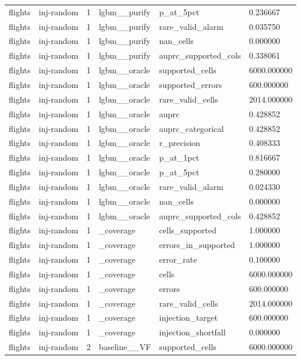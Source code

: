 \begin{tabular}{llllll}
flights & inj-random & 1 & lgbm\_\_purify & p\_at\_5pct & 0.236667 \\
flights & inj-random & 1 & lgbm\_\_purify & rare\_valid\_alarm & 0.035750 \\
flights & inj-random & 1 & lgbm\_\_purify & nan\_cells & 0.000000 \\
flights & inj-random & 1 & lgbm\_\_purify & auprc\_supported\_cols & 0.338061 \\
flights & inj-random & 1 & lgbm\_\_oracle & supported\_cells & 6000.000000 \\
flights & inj-random & 1 & lgbm\_\_oracle & supported\_errors & 600.000000 \\
flights & inj-random & 1 & lgbm\_\_oracle & rare\_valid\_cells & 2014.000000 \\
flights & inj-random & 1 & lgbm\_\_oracle & auprc & 0.428852 \\
flights & inj-random & 1 & lgbm\_\_oracle & auprc\_categorical & 0.428852 \\
flights & inj-random & 1 & lgbm\_\_oracle & r\_precision & 0.408333 \\
flights & inj-random & 1 & lgbm\_\_oracle & p\_at\_1pct & 0.816667 \\
flights & inj-random & 1 & lgbm\_\_oracle & p\_at\_5pct & 0.280000 \\
flights & inj-random & 1 & lgbm\_\_oracle & rare\_valid\_alarm & 0.024330 \\
flights & inj-random & 1 & lgbm\_\_oracle & nan\_cells & 0.000000 \\
flights & inj-random & 1 & lgbm\_\_oracle & auprc\_supported\_cols & 0.428852 \\
flights & inj-random & 1 & \_coverage & cells\_supported & 1.000000 \\
flights & inj-random & 1 & \_coverage & errors\_in\_supported & 1.000000 \\
flights & inj-random & 1 & \_coverage & error\_rate & 0.100000 \\
flights & inj-random & 1 & \_coverage & cells & 6000.000000 \\
flights & inj-random & 1 & \_coverage & errors & 600.000000 \\
flights & inj-random & 1 & \_coverage & rare\_valid\_cells & 2014.000000 \\
flights & inj-random & 1 & \_coverage & injection\_target & 600.000000 \\
flights & inj-random & 1 & \_coverage & injection\_shortfall & 0.000000 \\
flights & inj-random & 2 & baseline\_\_VF & supported\_cells & 6000.000000 \\

\end{tabular}

